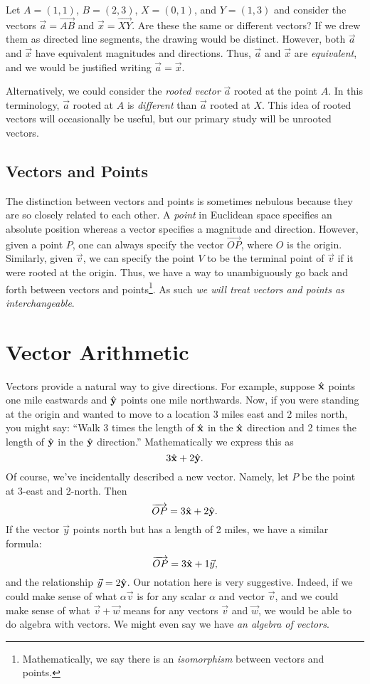 Let $A=(1,1)$, $B=(2,3)$, $X=(0,1)$, and $Y=(1,3)$ and consider the vectors
$\vec a = \overrightarrow{AB}$ and $\vec x=\overrightarrow{XY}$.  Are these
the same or different vectors?  If we drew them as directed line segments,
the drawing would be distinct.  However, both $\vec a$ and $\vec x$ have equivalent
magnitudes and directions.  Thus, $\vec a$ and $\vec x$ are \emph{equivalent},
and we would be justified writing $\vec a=\vec x$.

Alternatively, we could consider the \emph{rooted vector}
$\vec a$ rooted at the point $A$.  In this terminology, $\vec a$ rooted
at $A$ is \emph{different} than $\vec a$ rooted at $X$.  This idea
of rooted vectors will occasionally be useful, but our primary study will be unrooted
vectors.

\subsection{Vectors and Points}
The distinction between vectors and points is sometimes nebulous because
they are so closely related to each other.  A \emph{point}
in Euclidean space specifies an absolute position whereas a vector
specifies a magnitude and direction.  However, given a point $P$,
one can always specify the vector $\overrightarrow{OP}$, where $O$
is the origin.  Similarly, given $\vec v$, we can specify the point $V$
to be the terminal point of $\vec v$ if it were rooted at the origin.
Thus, we have a way to unambiguously go back and forth between vectors and 
points\footnote{ Mathematically, we say there is an \emph{isomorphism} between
vectors and points.}.  As such \emph{we will treat vectors and points
as interchangeable}.


\section{Vector Arithmetic}
Vectors provide a natural way to give directions.
For example, suppose ${\hat {\mathbf x}}$ points one mile eastwards and ${\hat {\mathbf y}}$
points one mile northwards.  Now, if you were standing at the origin
and wanted to move to a location 3 miles east and 2 miles north, you might say:
``Walk 3 times the length of ${\hat {\mathbf x}}$  in the ${\hat {\mathbf x}}$ direction and 2 times
the length of ${\hat {\mathbf y}}$ in the ${\hat {\mathbf y}}$ direction.''  Mathematically we express this
as
\[
	3{\hat {\mathbf x}}+2{\hat {\mathbf y}}.
\]
Of course, we've incidentally described a new vector.  Namely, let $P$
be the point at 3-east and 2-north.  Then
\[
	\overrightarrow{OP}=3{\hat {\mathbf x}}+2{\hat {\mathbf y}}.
\]
If the vector $\vec y$ points north but has a length of 2 miles, we have
a similar formula:
\[
	\overrightarrow{OP}=3{\hat {\mathbf x}}+1\vec y,
\]
and the relationship $\vec y=2{\hat {\mathbf y}}$.
Our notation here is very suggestive.  Indeed, if we could make
sense of what $\alpha\vec v$ is for any scalar $\alpha$ and vector
$\vec v$, and we could make sense of what $\vec v+\vec w$
means for any vectors $\vec v$ and $\vec w$, we would be able to
do algebra with vectors.  We might even say we have \emph{an algebra
of vectors}.

